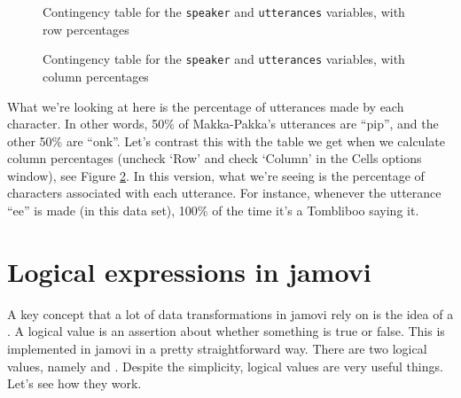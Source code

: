 \vspace{0.5cm}
\begin{figure}[!!htb]
\begin{center}
\caption{Contingency table for the \texttt{speaker} and \texttt{utterances} variables, with row percentages}
\label{fig:contingencyrow}
\HR
\end{center}
\end{figure}

\begin{figure}[!!htb]
\begin{center}
\caption{Contingency table for the \texttt{speaker} and \texttt{utterances} variables, with column percentages}
\label{fig:contingencycol}
\HR
\end{center}
\end{figure}

What we're looking at here is the percentage of utterances made by each character. In other words, 50\% of Makka-Pakka's utterances are ``pip'', and the other 50\% are ``onk''. Let's contrast this with the table we get when we calculate column percentages (uncheck `Row' and check `Column' in the Cells options window), see Figure \ref{fig:contingencycol}. In this version, what we're seeing is the percentage of characters associated with each utterance. For instance, whenever the utterance ``ee'' is made (in this data set), 100\% of the time it's a Tombliboo saying it. 


\section{Logical expressions in jamovi\label{sec:logicals}}

A key concept that a lot of data transformations in jamovi rely on is the idea of a . A logical value is an assertion about whether something is true or false. This is implemented in jamovi in a pretty straightforward way. There are two logical values, namely  and . Despite the simplicity, logical values are very useful things. Let's see how they work.


